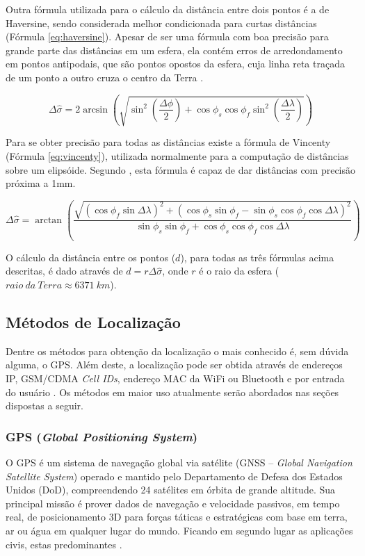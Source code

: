 \documentclass[diss]{template/setrem}
\begin{document}
Outra fórmula utilizada para o cálculo da distância entre dois pontos é a de Haversine, sendo considerada melhor condicionada para curtas distâncias (Fórmula \ref{eq:haversine}). Apesar de ser uma fórmula com boa precisão para grande parte das distâncias em um esfera, ela contém erros de arredondamento em pontos antipodais, que são pontos opostos da esfera, cuja linha reta traçada de um ponto a outro cruza o centro da Terra \citep{TheGeometryoftheEarth2012}.

\begin{equation}
\label{eq:haversine}
\Delta \hat{\sigma} = 2 \arcsin\left ( \sqrt{\sin^{2} \left (\frac{\Delta\phi}{2} \right) + \cos \phi _{s} \cos \phi _{f} \sin ^{2} \left ( \frac{\Delta \lambda }{2} \right )} \right )
\end{equation}

Para se obter precisão para todas as distâncias existe a fórmula de Vincenty (Fórmula \ref{eq:vincenty}), utilizada normalmente para a computação de distâncias sobre um elipsóide. Segundo \citet{MovableType2012}, esta fórmula é capaz de dar distâncias com precisão próxima a 1mm.

\begin{equation}
\label{eq:vincenty}
\Delta \hat{\sigma} = \arctan \left ( \frac{\sqrt{\left ( \cos \phi _{f} \sin \Delta \lambda  \right )^{2} + \left ( \cos \phi _{s} \sin \phi _{f} - \sin \phi _{s} \cos \phi _{f} \cos \Delta \lambda \right )^{2}}}{\sin \phi _{s} \sin \phi _{f} + \cos \phi _{s} \cos \phi _{f} \cos \Delta \lambda} \right )
\end{equation}

O cálculo da distância entre os pontos ($d$), para todas as três fórmulas acima descritas, é dado através de $d = r \Delta \hat{\sigma }$, onde $r$ é o raio da esfera ($raio \: da \: Terra \approx 6371 \: km$).

\subsection{Métodos de Localização}
\label{subsec:metodosloc}
Dentre os métodos para obtenção da localização o mais conhecido é, sem dúvida alguma, o GPS. Além deste, a localização pode ser obtida através de endereços IP, GSM/CDMA \emph{Cell IDs}, endereço MAC da WiFi ou Bluetooth e por entrada do usuário \citep{Holdener2011}. Os métodos em maior uso atualmente serão abordados nas seções dispostas a seguir.

\subsubsection{GPS (\textit{Global Positioning System})}
O GPS é um sistema de navegação global via satélite (GNSS -- \emph{Global Navigation Satellite System}) operado e mantido pelo Departamento de Defesa dos Estados Unidos (DoD), compreendendo 24 satélites em órbita de grande altitude. Sua principal missão é prover dados de navegação e velocidade passivos, em tempo real, de posicionamento 3D para forças táticas e estratégicas com base em terra, ar ou água em qualquer lugar do mundo. Ficando em segundo lugar as aplicações civis, estas predominantes \citep{USArmyCorpsofEngineers2003}.
\end{document}
